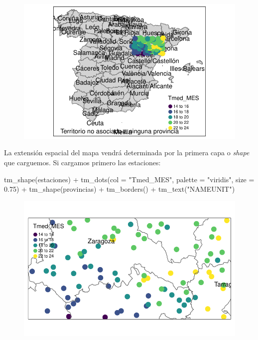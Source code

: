 \documentclass[
  letterpaper,
  DIV=11,
  numbers=noendperiod]{scrreprt}
\newenvironment{Shaded}{\begin{snugshade}}{\end{snugshade}}
\newcommand{\AttributeTok}[1]{\textcolor[rgb]{0.40,0.45,0.13}{#1}}
\newcommand{\FloatTok}[1]{\textcolor[rgb]{0.68,0.00,0.00}{#1}}
\newcommand{\FunctionTok}[1]{\textcolor[rgb]{0.28,0.35,0.67}{#1}}
\newcommand{\NormalTok}[1]{\textcolor[rgb]{0.00,0.23,0.31}{#1}}
\newcommand{\SpecialCharTok}[1]{\textcolor[rgb]{0.37,0.37,0.37}{#1}}
\newcommand{\StringTok}[1]{\textcolor[rgb]{0.13,0.47,0.30}{#1}}
\begin{document}
\begin{figure}[H]

{\centering \includegraphics{03_DatosEspaciales_files/figure-pdf/unnamed-chunk-15-1.pdf}

}

\end{figure}

La extensión espacial del mapa vendrá determinada por la primera capa o
\emph{shape} que carguemos. Si cargamos primero las estaciones:

\begin{Shaded}
\begin{Highlighting}[]
\FunctionTok{tm\_shape}\NormalTok{(estaciones) }\SpecialCharTok{+}
    \FunctionTok{tm\_dots}\NormalTok{(}\AttributeTok{col =} \StringTok{"Tmed\_MES"}\NormalTok{, }\AttributeTok{palette =} \StringTok{"viridis"}\NormalTok{, }\AttributeTok{size =} \FloatTok{0.75}\NormalTok{) }\SpecialCharTok{+}
\FunctionTok{tm\_shape}\NormalTok{(provincias) }\SpecialCharTok{+}
    \FunctionTok{tm\_borders}\NormalTok{() }\SpecialCharTok{+}
    \FunctionTok{tm\_text}\NormalTok{(}\StringTok{"NAMEUNIT"}\NormalTok{) }
\end{Highlighting}
\end{Shaded}

\begin{figure}[H]

{\centering \includegraphics{03_DatosEspaciales_files/figure-pdf/unnamed-chunk-16-1.pdf}

}

\end{figure}
\end{document}
